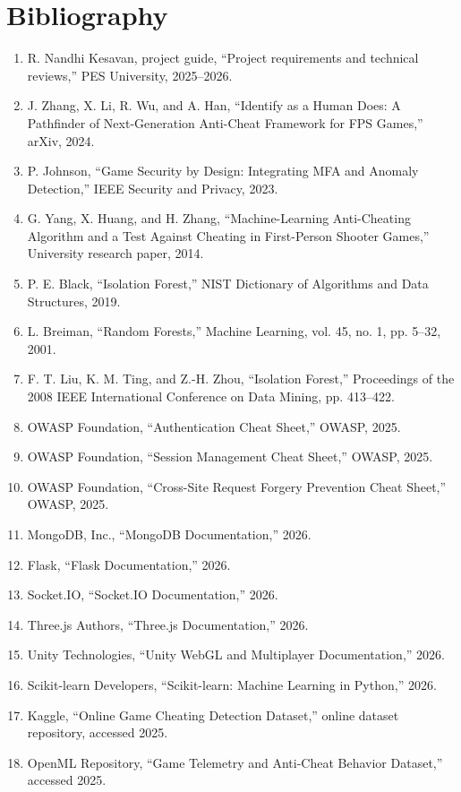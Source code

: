 \documentclass[12pt,a4paper,oneside]{report}
\begin{document}
\chapter{Bibliography}
\begin{enumerate}[leftmargin=18mm]
\item R. Nandhi Kesavan, project guide, “Project requirements and technical reviews,” PES University, 2025--2026.
\item J. Zhang, X. Li, R. Wu, and A. Han, “Identify as a Human Does: A Pathfinder of Next-Generation Anti-Cheat Framework for FPS Games,” arXiv, 2024.
\item P. Johnson, “Game Security by Design: Integrating MFA and Anomaly Detection,” IEEE Security and Privacy, 2023.
\item G. Yang, X. Huang, and H. Zhang, “Machine-Learning Anti-Cheating Algorithm and a Test Against Cheating in First-Person Shooter Games,” University research paper, 2014.
\item P. E. Black, “Isolation Forest,” NIST Dictionary of Algorithms and Data Structures, 2019.
\item L. Breiman, “Random Forests,” Machine Learning, vol. 45, no. 1, pp. 5--32, 2001.
\item F. T. Liu, K. M. Ting, and Z.-H. Zhou, “Isolation Forest,” Proceedings of the 2008 IEEE International Conference on Data Mining, pp. 413--422.
\item OWASP Foundation, “Authentication Cheat Sheet,” OWASP, 2025.
\item OWASP Foundation, “Session Management Cheat Sheet,” OWASP, 2025.
\item OWASP Foundation, “Cross-Site Request Forgery Prevention Cheat Sheet,” OWASP, 2025.
\item MongoDB, Inc., “MongoDB Documentation,” 2026.
\item Flask, “Flask Documentation,” 2026.
\item Socket.IO, “Socket.IO Documentation,” 2026.
\item Three.js Authors, “Three.js Documentation,” 2026.
\item Unity Technologies, “Unity WebGL and Multiplayer Documentation,” 2026.
\item Scikit-learn Developers, “Scikit-learn: Machine Learning in Python,” 2026.
\item Kaggle, “Online Game Cheating Detection Dataset,” online dataset repository, accessed 2025.
\item OpenML Repository, “Game Telemetry and Anti-Cheat Behavior Dataset,” accessed 2025.
\end{enumerate}
\end{document}
